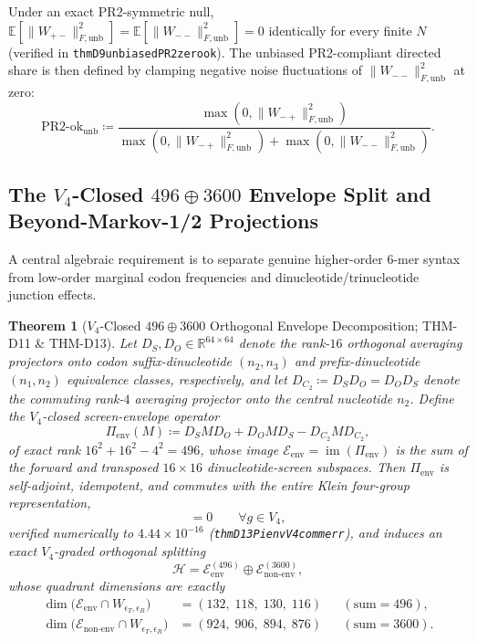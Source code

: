 \documentclass[11pt, a4paper]{article}
\newtheorem{theorem}{Theorem}[section]
\DeclareRobustCommand{\_}{\textunderscore\allowbreak}
\begin{document}
Under an exact PR2-symmetric null, $\mathbb{E}[\|W_{+-}\|_{F,\mathrm{unb}}^2] = \mathbb{E}[\|W_{--}\|_{F,\mathrm{unb}}^2] = 0$ identically for every finite $N$ (verified in \texttt{thmD9\_unbiased\_PR2\_zero\_ok}). The unbiased PR2-compliant directed share is then defined by clamping negative noise fluctuations of $\|W_{--}\|_{F,\mathrm{unb}}^2$ at zero:
\begin{equation}
    \mathrm{PR2\text{-}ok}_{\mathrm{unb}} \coloneqq \frac{\max(0, \|W_{-+}\|_{F,\mathrm{unb}}^2)}{\max(0, \|W_{-+}\|_{F,\mathrm{unb}}^2) + \max(0, \|W_{--}\|_{F,\mathrm{unb}}^2)}.
\end{equation}

\subsection{The $V_4$-Closed $496 \oplus 3600$ Envelope Split and Beyond-Markov-1/2 Projections}

A central algebraic requirement is to separate genuine higher-order 6-mer syntax from low-order marginal codon frequencies and dinucleotide/trinucleotide junction effects.

\begin{theorem}[$V_4$-Closed $496 \oplus 3600$ Orthogonal Envelope Decomposition; THM-D11 \& THM-D13]
\label{thm:env496}
Let $D_S, D_O \in \mathbb{R}^{64 \times 64}$ denote the rank-$16$ orthogonal averaging projectors onto codon suffix-dinucleotide $(n_2, n_3)$ and prefix-dinucleotide $(n_1, n_2)$ equivalence classes, respectively, and let $D_{C_2} \coloneqq D_S D_O = D_O D_S$ denote the commuting rank-$4$ averaging projector onto the central nucleotide $n_2$. Define the $V_4$-closed screen-envelope operator
\begin{equation}
    \Pi_{\mathrm{env}}(M) \coloneqq D_S M D_O + D_O M D_S - D_{C_2} M D_{C_2},
\end{equation}
of exact rank $16^2 + 16^2 - 4^2 = 496$, whose image $\mathcal{E}_{\mathrm{env}} = \operatorname{im}(\Pi_{\mathrm{env}})$ is the sum of the forward and transposed $16 \times 16$ dinucleotide-screen subspaces. Then $\Pi_{\mathrm{env}}$ is self-adjoint, idempotent, and commutes with the entire Klein four-group representation,
\begin{equation}
    [\Pi_{\mathrm{env}},\, g] = 0 \qquad \forall g \in V_4,
\end{equation}
verified numerically to $4.44 \times 10^{-16}$ (\texttt{thmD13\_Pi\_env\_V4\_comm\_err}), and induces an exact $V_4$-graded orthogonal splitting
\begin{equation}
    \mathcal{H} = \mathcal{E}_{\mathrm{env}}^{(496)} \oplus \mathcal{E}_{\mathrm{non\text{-}env}}^{(3600)},
\end{equation}
whose quadrant dimensions are exactly
\begin{align}
    \dim\bigl(\mathcal{E}_{\mathrm{env}} \cap W_{\epsilon_T,\epsilon_R}\bigr) &= (132,\; 118,\; 130,\; 116) && (\text{sum} = 496), \\
    \dim\bigl(\mathcal{E}_{\mathrm{non\text{-}env}} \cap W_{\epsilon_T,\epsilon_R}\bigr) &= (924,\; 906,\; 894,\; 876) && (\text{sum} = 3600).
\end{align}
\end{theorem}
\end{document}
